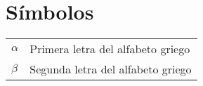 \clearpage
{}
\chapter*{Símbolos}

\noindent
\begin{xtabular}{@{}p{1.25cm}@{}l}
\shrinkheight{-155pt}
$\alpha$				& Primera letra del alfabeto griego \\
$\beta$					& Segunda letra del alfabeto griego \\
\end{xtabular}